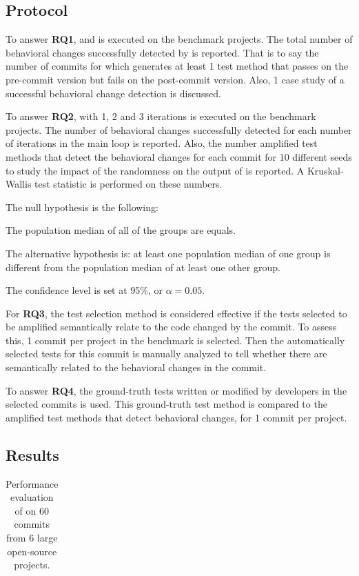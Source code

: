 \subsection{Protocol}
\label{subsec:dci:evaluation:protocol}

To answer \textbf{RQ1}, \DCIA and \DCII is executed on the benchmark projects.
The total number of behavioral changes successfully detected by \DCI is reported.
That is to say the number of commits for which \DCI generates at least 1 test method that passes on the pre-commit version but fails on the post-commit version.
Also, 1 case study of a successful behavioral change detection is discussed.

To answer \textbf{RQ2}, \DCII with 1, 2 and 3 iterations is executed on the benchmark projects.
The number of behavioral changes successfully detected for each number of iterations in the main loop is reported.
Also, the number amplified test methods that detect the behavioral changes for each commit for 10 different seeds to study the impact of the randomness on the output of \dspot is reported.
A Kruskal-Wallis test statistic is performed on these numbers.

The null hypothesis is the following: 

The population median of all of the groups are equals.

The alternative hypothesis is: at least one population median of one group is different from the population median of at least one other group.

The confidence level is set at 95\%, or $\alpha = 0.05$.

For \textbf{RQ3}, the test selection method is considered effective if the tests selected to be amplified semantically relate to the code changed by the commit. 
To assess this, 1 commit per project in the benchmark is selected.
Then the automatically selected tests for this commit is manually analyzed to tell whether there are semantically related to the behavioral changes in the commit. 

To answer \textbf{RQ4}, the ground-truth tests written or modified by developers in the selected commits is used.
This ground-truth test method is compared to the amplified test methods that detect behavioral changes, for 1 commit per project.

\subsection{Results}
\label{subsec:result}
\begin{table}
\centering
\small
\def\arraystretch{0.3}%
\setlength\tabcolsep{.35pt} %
\caption{Performance evaluation of \DCI on 60 commits from 6 large open-source projects.}
\label{tab:overall_result}
\begin{tabular}{l|c|rcccc|c|cc|cc|cc|cc}

\end{tabular}
\end{table}

